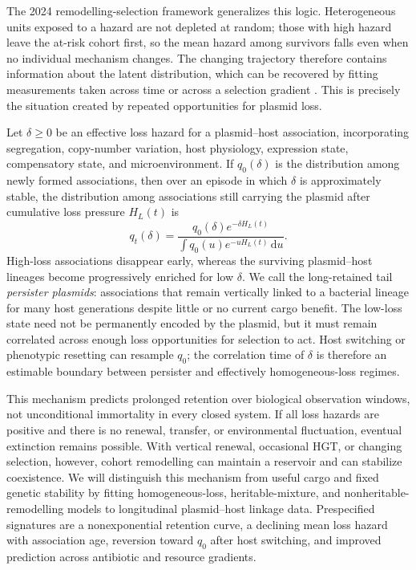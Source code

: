 \documentclass[12pt,a4paper]{article}
\newcommand{\dd}{\,\mathrm{d}}
\begin{document}
The 2024 remodelling-selection framework generalizes this logic. Heterogeneous units exposed to a hazard are not depleted at random; those with high hazard leave the at-risk cohort first, so the mean hazard among survivors falls even when no individual mechanism changes. The changing trajectory therefore contains information about the latent distribution, which can be recovered by fitting measurements taken across time or across a selection gradient \citep{gomes2024}. This is precisely the situation created by repeated opportunities for plasmid loss.

Let $\delta\ge0$ be an effective loss hazard for a plasmid--host association, incorporating segregation, copy-number variation, host physiology, expression state, compensatory state, and microenvironment. If $q_0(\delta)$ is the distribution among newly formed associations, then over an episode in which $\delta$ is approximately stable, the distribution among associations still carrying the plasmid after cumulative loss pressure $H_L(t)$ is
\begin{equation}
q_t(\delta)=\frac{q_0(\delta)e^{-\delta H_L(t)}}{\int q_0(u)e^{-uH_L(t)}\dd u}.
\label{eq:persister_plasmids}
\end{equation}
High-loss associations disappear early, whereas the surviving plasmid--host lineages become progressively enriched for low $\delta$. We call the long-retained tail \emph{persister plasmids}: associations that remain vertically linked to a bacterial lineage for many host generations despite little or no current cargo benefit. The low-loss state need not be permanently encoded by the plasmid, but it must remain correlated across enough loss opportunities for selection to act. Host switching or phenotypic resetting can resample $q_0$; the correlation time of $\delta$ is therefore an estimable boundary between persister and effectively homogeneous-loss regimes.

This mechanism predicts prolonged retention over biological observation windows, not unconditional immortality in every closed system. If all loss hazards are positive and there is no renewal, transfer, or environmental fluctuation, eventual extinction remains possible. With vertical renewal, occasional HGT, or changing selection, however, cohort remodelling can maintain a reservoir and can stabilize coexistence. We will distinguish this mechanism from useful cargo and fixed genetic stability by fitting homogeneous-loss, heritable-mixture, and nonheritable-remodelling models to longitudinal plasmid--host linkage data. Prespecified signatures are a nonexponential retention curve, a declining mean loss hazard with association age, reversion toward $q_0$ after host switching, and improved prediction across antibiotic and resource gradients.
\end{document}

